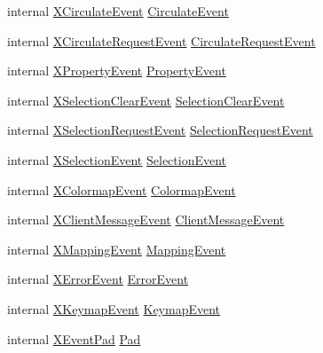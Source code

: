 \begin{DoxyCompactItemize}
\item 
internal \hyperlink{struct_tao_1_1_platform_1_1_x11_1_1_x_circulate_event}{XCirculateEvent} \hyperlink{struct_tao_1_1_platform_1_1_x11_1_1_x_event_a06c575f23bbbb3649aa23773a47e0ba5}{CirculateEvent}
\item 
internal \hyperlink{struct_tao_1_1_platform_1_1_x11_1_1_x_circulate_request_event}{XCirculateRequestEvent} \hyperlink{struct_tao_1_1_platform_1_1_x11_1_1_x_event_a99cfeb745e24817ab71044d16e1a0541}{CirculateRequestEvent}
\item 
internal \hyperlink{struct_tao_1_1_platform_1_1_x11_1_1_x_property_event}{XPropertyEvent} \hyperlink{struct_tao_1_1_platform_1_1_x11_1_1_x_event_a178a007ce9d294b54b3a8492879321c1}{PropertyEvent}
\item 
internal \hyperlink{struct_tao_1_1_platform_1_1_x11_1_1_x_selection_clear_event}{XSelectionClearEvent} \hyperlink{struct_tao_1_1_platform_1_1_x11_1_1_x_event_aab9ed8527448f1aad24e866e31dca242}{SelectionClearEvent}
\item 
internal \hyperlink{struct_tao_1_1_platform_1_1_x11_1_1_x_selection_request_event}{XSelectionRequestEvent} \hyperlink{struct_tao_1_1_platform_1_1_x11_1_1_x_event_a21b3940fdef6abd9a9c3d582010e317e}{SelectionRequestEvent}
\item 
internal \hyperlink{struct_tao_1_1_platform_1_1_x11_1_1_x_selection_event}{XSelectionEvent} \hyperlink{struct_tao_1_1_platform_1_1_x11_1_1_x_event_a6c76dc999dd0179f81ba9b4ba58ce7a6}{SelectionEvent}
\item 
internal \hyperlink{struct_tao_1_1_platform_1_1_x11_1_1_x_colormap_event}{XColormapEvent} \hyperlink{struct_tao_1_1_platform_1_1_x11_1_1_x_event_aef078a479704a43347a188564d9cb24e}{ColormapEvent}
\item 
internal \hyperlink{struct_tao_1_1_platform_1_1_x11_1_1_x_client_message_event}{XClientMessageEvent} \hyperlink{struct_tao_1_1_platform_1_1_x11_1_1_x_event_a4486db19b96e2f0127eae8843b7ce019}{ClientMessageEvent}
\item 
internal \hyperlink{struct_tao_1_1_platform_1_1_x11_1_1_x_mapping_event}{XMappingEvent} \hyperlink{struct_tao_1_1_platform_1_1_x11_1_1_x_event_aee078cffebd424ad39a7e3a7b74e331f}{MappingEvent}
\item 
internal \hyperlink{struct_tao_1_1_platform_1_1_x11_1_1_x_error_event}{XErrorEvent} \hyperlink{struct_tao_1_1_platform_1_1_x11_1_1_x_event_a96a555129f1f8b1982ac3ff7f6a0679b}{ErrorEvent}
\item 
internal \hyperlink{struct_tao_1_1_platform_1_1_x11_1_1_x_keymap_event}{XKeymapEvent} \hyperlink{struct_tao_1_1_platform_1_1_x11_1_1_x_event_a6425c971a6a060148886a1c0511aad56}{KeymapEvent}
\item 
internal \hyperlink{struct_tao_1_1_platform_1_1_x11_1_1_x_event_pad}{XEventPad} \hyperlink{struct_tao_1_1_platform_1_1_x11_1_1_x_event_a436feb972007223cee91783bf2021907}{Pad}
\end{DoxyCompactItemize}


